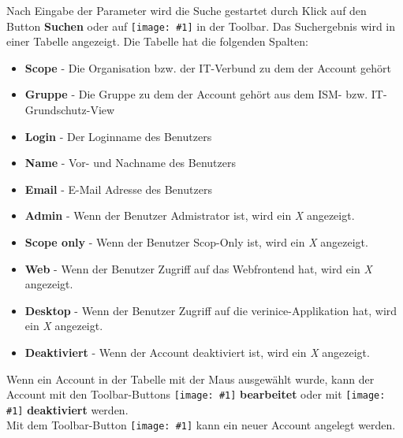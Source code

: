 \documentclass[a4paper,10pt]{book}
\newcommand{\icon}[1]{\texttt{[image: \#1]}}
\begin{document}
Nach Eingabe der Parameter wird die Suche gestartet durch Klick auf den Button \textbf{Suchen} oder auf \icon{Icon/search.png} in der Toolbar. Das Suchergebnis wird in einer Tabelle angezeigt. Die Tabelle hat die folgenden Spalten:
\begin{itemize}
\item \textbf{Scope} - Die Organisation bzw. der IT-Verbund zu dem der Account gehört
\item \textbf{Gruppe} - Die Gruppe zu dem der Account gehört aus dem ISM- bzw. IT-Grundschutz-View
\item \textbf{Login} - Der Loginname des Benutzers
\item \textbf{Name} - Vor- und Nachname des Benutzers
\item \textbf{Email} - E-Mail Adresse des Benutzers
\item \textbf{Admin} - Wenn der Benutzer Admistrator ist, wird ein \textit{X} angezeigt.
\item \textbf{Scope only} - Wenn der Benutzer Scop-Only ist, wird ein \textit{X} angezeigt.
\item \textbf{Web} - Wenn der Benutzer Zugriff auf das Webfrontend hat, wird ein \textit{X} angezeigt.
\item \textbf{Desktop} - Wenn der Benutzer Zugriff auf die verinice-Applikation hat, wird ein \textit{X} angezeigt.
\item \textbf{Deaktiviert} - Wenn der Account deaktiviert ist, wird ein \textit{X} angezeigt.
\end{itemize}

Wenn ein Account in der Tabelle mit der Maus ausgewählt wurde, kann der Account mit den Toolbar-Buttons \icon{Icon/Edit.png} \textbf{bearbeitet} oder mit \icon{Icon/user_disabled.png} \textbf{deaktiviert} werden.
\newline\\
Mit dem Toolbar-Button \icon{Icon/user_add.png} kann ein neuer Account angelegt werden.
\end{document}
